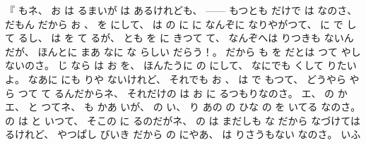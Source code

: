 %
『
もネ、
%
お
は
るまいが
は
あるけれども、
{---}{---}
もつとも
%
だけで
は
なのさ、
%
だもん
だから
お
、
%
を
にして、
%
は
の
に
に
なんぞに
なりやがつて、
%
に
で
して
るし、
%
は
を
て
るが、
%
とも
を
に
きつて
て、
%
なんぞへは
りつきも
ないんだが、
%
ほんとに
まあ
なに
な
らしい
だらう！。
%
だから
も
を
だとは
つて
やしないのさ。
%
じ
なら
は
お
を、
%
ほんたうに
の
にして、
%
なにでも
くして
りたいよ。
%
なあに
にも
りや
ないけれど、
%
それでも
お
、
%
は
で
もつて、
%
どうやら
やら
つて
て
るんだからネ、
%
それだけの
は
お
に
るつもりなのさ。
%
エ、
%
の
かエ、
%
%
と
つてネ、
%
も
かあ
いが、
%
の
い、
%
り
あの
の
ひな
の
を
いてる
なのさ。
%
の
は
と
いつて、
%
そこの
に
るのだがネ、
%
の
は
まだしも
な
だから
なづけては
るけれど、
%
やつぱし
びいき
だから
の
にやあ、
%
は
りさうもない
なのさ。
%
いふ
